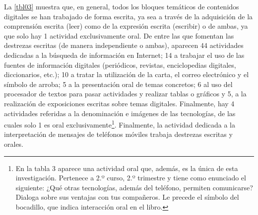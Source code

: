 \documentclass[spanish]{textolivre}
\begin{document}
La \cref{tbl03} muestra que, en general, todos los bloques temáticos de contenidos digitales se han trabajado de forma escrita, ya sea a través de la adquisición de la comprensión escrita (leer) como de la expresión escrita (escribir) o de ambas, ya que solo hay 1 actividad exclusivamente oral. De entre las que fomentan las destrezas escritas (de manera independiente o ambas), aparecen 44 actividades dedicadas a la búsqueda de información en Internet; 14 a trabajar el uso de las fuentes de información digitales (periódicos, revistas, enciclopedias digitales, diccionarios, etc.); 10 a tratar la utilización de la carta, el correo electrónico y el símbolo de arroba; 5 a la presentación oral de temas concretos; 6 al uso del procesador de textos para pasar actividades y realizar tablas o gráficos y 5, a la realización de exposiciones escritas sobre temas digitales. Finalmente, hay 4 actividades referidas a la denominación e imágenes de las tecnologías, de las cuales solo 1 es oral exclusivamente\footnote{En la tabla 3 aparece una actividad oral que, además, es la única de esta investigación. Pertenece a 2.º curso, 2.º trimestre y tiene como enunciado el siguiente: ¿Qué otras tecnologías, además del teléfono, permiten comunicarse? Dialoga sobre sus ventajas con tus compañeros. Le precede el símbolo del bocadillo, que indica interacción oral en el libro.}. Finalmente, la actividad dedicada a la interpretación de mensajes de teléfonos móviles trabaja destrezas escritas y orales. 
\end{document}
